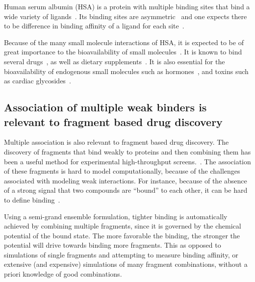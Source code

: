 \documentclass[10pt,final]{article}
\begin{document}
Human serum albumin (HSA) is a protein with multiple binding sites that bind a wide variety of ligands~\cite{He1992a,Kragh-Hansen2002a,Sulkowska2002a}. Its binding sites are asymmetric~\cite{He1992a, Curry1998a} and one expects there to be difference in binding affinity of a ligand for each site~\cite{Sudlow1976a}.


Because of the many small molecule interactions of HSA, it is expected to be of great importance to the bioavailability of small molecules~\cite{Metcalfe2010a}. It is known to bind several drugs~\cite{SJOeHOLM1979a,Bannwarth1996a,Sulkowska2002a,Ghuman2005a,Perez2007a}, as well as dietary supplements~\cite{Pal2013a}. It is also essential for the bioavailability of endogenous small molecules such as hormones~\cite{Pardridge1986a}, and toxins such as cardiac glycosides~\cite{Smith1985a}. 

\subsection*{Association of multiple weak binders is relevant to fragment based drug discovery}
Multiple association is also relevant to fragment based drug discovery. The discovery of fragments that bind weakly to proteins and then combining them has been a useful method for experimental high-throughput screens.~\cite{Hajduk2007a}. The association of these fragments is hard to model computationally, because of the challenges associated with modeling weak interactions. For instance, because of the absence of a strong signal that two compounds are ``bound'' to each other, it can be hard to define binding~\cite{Gilson1997a}. 

Using a semi-grand ensemble formulation, tighter binding is automatically achieved by combining multiple fragments, since it is governed by the chemical potential of the bound state. The more favorable the binding, the stronger the potential will drive towards binding more fragments. This as opposed to simulations of single fragments and attempting to measure binding affinity, or extensive (and expensive) simulations of many fragment combinations, without a priori knowledge of good combinations. 

\end{document}
